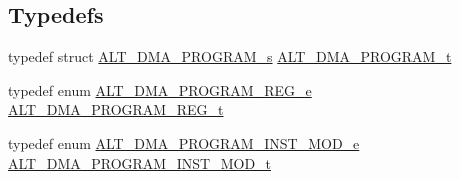 \subsection*{Typedefs}
\begin{DoxyCompactItemize}
\item 
typedef struct \mbox{\hyperlink{structALT__DMA__PROGRAM__s}{A\+L\+T\+\_\+\+D\+M\+A\+\_\+\+P\+R\+O\+G\+R\+A\+M\+\_\+s}} \mbox{\hyperlink{group__ALT__DMA__PRG_gadb7028531574894854db4db6d797de97}{A\+L\+T\+\_\+\+D\+M\+A\+\_\+\+P\+R\+O\+G\+R\+A\+M\+\_\+t}}
\item 
typedef enum \mbox{\hyperlink{group__ALT__DMA__PRG_ga5976fbec36fb5886299550ec7d57ef01}{A\+L\+T\+\_\+\+D\+M\+A\+\_\+\+P\+R\+O\+G\+R\+A\+M\+\_\+\+R\+E\+G\+\_\+e}} \mbox{\hyperlink{group__ALT__DMA__PRG_ga772371a3d6334e110911154cf94950e8}{A\+L\+T\+\_\+\+D\+M\+A\+\_\+\+P\+R\+O\+G\+R\+A\+M\+\_\+\+R\+E\+G\+\_\+t}}
\item 
typedef enum \mbox{\hyperlink{group__ALT__DMA__PRG_ga6b384475142e2b8bedeb93223c460229}{A\+L\+T\+\_\+\+D\+M\+A\+\_\+\+P\+R\+O\+G\+R\+A\+M\+\_\+\+I\+N\+S\+T\+\_\+\+M\+O\+D\+\_\+e}} \mbox{\hyperlink{group__ALT__DMA__PRG_gaf8145a0ef11f4188f07bb0c961575d4a}{A\+L\+T\+\_\+\+D\+M\+A\+\_\+\+P\+R\+O\+G\+R\+A\+M\+\_\+\+I\+N\+S\+T\+\_\+\+M\+O\+D\+\_\+t}}
\end{DoxyCompactItemize}
